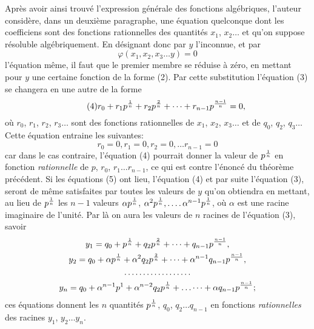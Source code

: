 \documentclass[oneside, 12 pt, leqno]{memoir}
\let\oldfrac\frac
\def\frac#1#2{\mathchoice{\text{\scalebox{.83}{${\oldfrac{#1}{#2}}$}}}{\text{\scalebox{.83}{${\displaystyle\oldfrac{#1}{#2}}$}}}{\genfrac{}{}{}{2}{#1}{#2}}{\genfrac{}{}{}{3}{#1}{#2}}}
\begin{document}
Après avoir ainsi trouvé l'expression générale des fonctions algébriques, l'auteur considère, dans un deuxième paragraphe, une équation quelconque dont les coefficiens sont des fonctions rationnelles des quantités \(x_1\), \(x_2 \dots\) et qu'on suppose résoluble algébriquement. En désignant donc par \(y\) l'inconnue, et par
\[\tag{3}\varphi\left(x_1, x_2, x_3 \dots y\right)=0\]
l'équation même, il faut que le premier membre se réduise à zéro, en mettant pour \(y\) une certaine fonction de la forme (2). Par cette substitution l'équation (3) se changera en une autre de la forme
\[\tag{4}r_0+r_1 p^{\frac{1}{n}}+r_2 p^{\frac{2}{n}}+\dots+r_{n-1} p^{\frac{n-1}{n}}=0,\]
où \(r_0\), \(r_1\), \(r_2\), \(r_3 \dots\) sont des fonctions rationnelles de \(x_1\), \(x_2\), \(x_3 \dots\) et de \(q_0\), \(q_2\), \(q_3 \dots\) Cette équation entraine les suivantes:
\[\tag{5}r_0=0, r_1=0, r_2=0, \dots r_{n-1}=0\]
car dans le cas contraire, l'équation (4) pourrait donner la valeur de \(p^{\frac{1}{n}}\) en fonction \textit{rationnelle} de \(p\), \(r_0\), \(r_1 \dots r_{n-1}\), ce qui est contre l'énoncé du théorème précédent. Si les équations (5) ont lieu, l'équation (4) et par suite l'équation (3), seront de même satisfaites par toutes les valeurs de \(y\) qu'on obtiendra en mettant, au lieu de \(p^{\frac{1}{n}}\) les \(n-1\) valeurs \(\alpha p^{\frac{1}{n}}\), \(\alpha^2 p^{\frac{1}{n}}, .\dots \alpha^{n-1} p^{\frac{1}{n}}\), où \(\alpha\) est une racine imaginaire de l'unité. Par là on aura les valeurs de \(n\) racines de l'équation (3), savoir
\[\begin{gathered}
y_1=q_0+p^{\frac{1}{n}}+q_2 p^{\frac{2}{n}}+\dots+q_{n-1} p^{\frac{n-1}{n}}, \\
y_2=q_0+\alpha p^{\frac{1}{n}}+\alpha^2 q_2 p^{\frac{2}{n}}+\dots+\alpha^{n-1} q_{n-1} p^{\frac{n-1}{n}}, \\
\dots \dots \dots \dots \dots \dots \\
y_n=q_0+\alpha^{n-1} p^1+\alpha^{n-2} q_2 p^{\frac{1}{n}}+\dots \dots+\alpha q_{n-1} p^{\frac{n-1}{n}};
\end{gathered}\]
ces équations donnent les \(n\) quantités \(p^{\frac{1}{n}}\), \(q_0\), \(q_2 \dots q_{n-1}\) en fonctions \textit{rationnelles} des racines \(y_1\), \(y_2 \dots y_n\).
\end{document}

